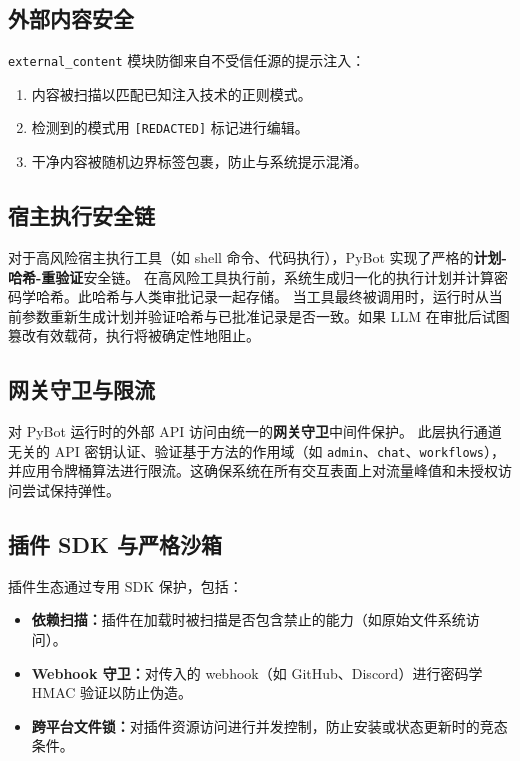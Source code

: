 \documentclass[11pt,a4paper]{article}
\begin{document}
\subsection{外部内容安全}

\texttt{external\_content} 模块防御来自不受信任源的提示注入：
\begin{enumerate}
  \item 内容被扫描以匹配已知注入技术的正则模式。
  \item 检测到的模式用 \texttt{[REDACTED]} 标记进行编辑。
  \item 干净内容被随机边界标签包裹，防止与系统提示混淆。
\end{enumerate}

\subsection{宿主执行安全链}

对于高风险宿主执行工具（如 shell 命令、代码执行），PyBot 实现了严格的\textbf{计划-哈希-重验证}安全链。
在高风险工具执行前，系统生成归一化的执行计划并计算密码学哈希。此哈希与人类审批记录一起存储。
当工具最终被调用时，运行时从当前参数重新生成计划并验证哈希与已批准记录是否一致。如果 LLM 在审批后试图篡改有效载荷，执行将被确定性地阻止。

\subsection{网关守卫与限流}

对 PyBot 运行时的外部 API 访问由统一的\textbf{网关守卫}中间件保护。
此层执行通道无关的 API 密钥认证、验证基于方法的作用域（如 \texttt{admin}、\texttt{chat}、\texttt{workflows}），并应用令牌桶算法进行限流。这确保系统在所有交互表面上对流量峰值和未授权访问尝试保持弹性。

\subsection{插件 SDK 与严格沙箱}

插件生态通过专用 SDK 保护，包括：
\begin{itemize}
  \item \textbf{依赖扫描：}插件在加载时被扫描是否包含禁止的能力（如原始文件系统访问）。
  \item \textbf{Webhook 守卫：}对传入的 webhook（如 GitHub、Discord）进行密码学 HMAC 验证以防止伪造。
  \item \textbf{跨平台文件锁：}对插件资源访问进行并发控制，防止安装或状态更新时的竞态条件。
\end{itemize}
\end{document}
